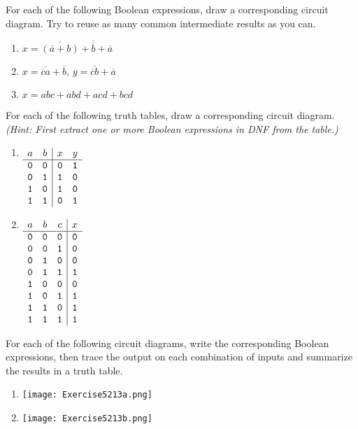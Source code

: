 \begin{exercises}
\item For each of the following Boolean expressions, draw a corresponding circuit diagram. Try to reuse as many common intermediate results as you can.
\begin{enumerate}
\item $x=\overline{(\overline{a}+b)}+\overline{\overline{b}}+\overline{a}$
\item $x=\overline{\overline{c}a}+\overline{b}$, $y=\overline{\overline{c}b}+\overline{a}$
\item $x=abc+abd+acd+bcd$
\end{enumerate}

\item For each of the following truth tables, draw a corresponding circuit diagram. \textit{(Hint: First extract one or more Boolean expressions in DNF from the table.)}
\begin{enumerate}
\item \( \begin{array}[t]{cc|cc}
a  & b  & x  & y\\ \hline
\mathtt{0} & \mathtt{0} & \mathtt{0} & \mathtt{1}\\
\mathtt{0} & \mathtt{1} & \mathtt{1} & \mathtt{0}\\
\mathtt{1} & \mathtt{0} & \mathtt{1} & \mathtt{0}\\
\mathtt{1} & \mathtt{1} & \mathtt{0} & \mathtt{1}
\end{array} \)
\item \( \begin{array}[t]{ccc|c}
a  & b  & c  & x\\ \hline
\mathtt{0} & \mathtt{0} & \mathtt{0} & \mathtt{0}\\
\mathtt{0} & \mathtt{0} & \mathtt{1} & \mathtt{0}\\
\mathtt{0} & \mathtt{1} & \mathtt{0} & \mathtt{0}\\
\mathtt{0} & \mathtt{1} & \mathtt{1} & \mathtt{1}\\
\mathtt{1} & \mathtt{0} & \mathtt{0} & \mathtt{0}\\
\mathtt{1} & \mathtt{0} & \mathtt{1} & \mathtt{1}\\
\mathtt{1} & \mathtt{1} & \mathtt{0} & \mathtt{1}\\
\mathtt{1} & \mathtt{1} & \mathtt{1} & \mathtt{1}
\end{array} \)
\end{enumerate}

\item For each of the following circuit diagrams, write the corresponding Boolean expressions, then trace the output on each combination of inputs and summarize the results in a truth table.
\begin{enumerate}
\item \texttt{[image: Exercise5213a.png]}
\item \texttt{[image: Exercise5213b.png]}
\end{enumerate}
\end{exercises}

